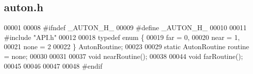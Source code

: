 \subsection{auton.\+h}
\label{auton_8h_source}

\begin{DoxyCode}
00001 
00008 \textcolor{preprocessor}{#ifndef \_AUTON\_H\_}
00009 \textcolor{preprocessor}{#define \_AUTON\_H\_}
00010 
00011 \textcolor{preprocessor}{#include "API.h"}
00012 
00018 \textcolor{keyword}{typedef} \textcolor{keyword}{enum} \{
00019   far = 0,
00020   near = 1,
00021   none = 2
00022 \} AutonRoutine;
00023 
00029 \textcolor{keyword}{static} AutonRoutine routine = none;
00030 
00031 
00037 \textcolor{keywordtype}{void} nearRoutine();
00038 
00044 \textcolor{keywordtype}{void} farRoutine();
00045 
00046 
00047 
00048 \textcolor{preprocessor}{#endif}
\end{DoxyCode}
